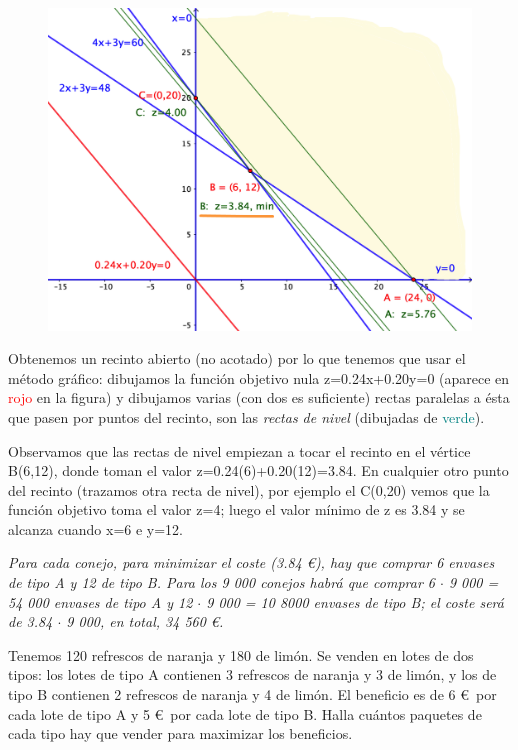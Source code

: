 \vspace{3mm}
\begin{figure}[H]
	\centering
	\includegraphics[width=.75\textwidth]{imagenes/img38.png}
\end{figure}

\vspace{3mm} Obtenemos un recinto abierto (no acotado) por lo que tenemos que usar el método gráfico: dibujamos la función objetivo nula z=0.24x+0.20y=0 (aparece en \textcolor{red}{rojo} en la figura) y dibujamos varias (con dos es suficiente) rectas paralelas a ésta que pasen por puntos del recinto, son las \emph{rectas de nivel} (dibujadas de \textcolor{teal}{verde}).

\vspace{3mm} Observamos que las rectas de nivel empiezan a tocar el recinto en el vértice B(6,12), donde toman el valor z=0.24(6)+0.20(12)=3.84. En cualquier otro punto del recinto (trazamos otra recta de nivel), por ejemplo el C(0,20) vemos que la función objetivo toma el valor z=4; luego el valor mínimo de z es 3.84 y se alcanza cuando x=6 e y=12.

\vspace{7mm}\emph{Para cada conejo, para minimizar el coste (3.84 \euro), hay que comprar 6 envases de tipo A y 12 de tipo B. Para los 9 000 conejos habrá que comprar 6 $\cdot$ 9 000 = 54 000 envases de tipo A y 12 $\cdot $  9 000 = 10 8000 envases de tipo B; el coste será de 3.84 $ \cdot  $ 9 000, en total, 34 560 \euro.}



\vspace{15mm}
\begin{ejemplo}
\begin{ejer}
	Tenemos 120 refrescos de naranja y 180 de limón. Se venden en lotes de dos tipos: los lotes de tipo A contienen 3 refrescos de naranja y 3 de limón, y los de tipo B contienen 2 refrescos de naranja y 4 de limón. El beneficio es de 6 \euro$\,$ por cada lote de tipo A y 5 \euro$\,$ por cada lote de tipo B. Halla cuántos paquetes de cada tipo hay que vender para maximizar los beneficios.
\end{ejer}	
\end{ejemplo}
\vspace{7mm}

